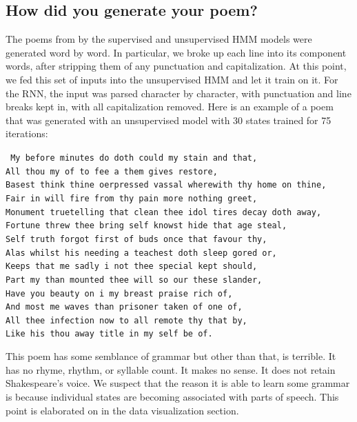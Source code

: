 \subsection{How did you generate your poem?}
The poems from by the supervised and unsupervised HMM models were generated word by word. In particular, we broke up each line into its component words, after stripping them of any punctuation and capitalization. At this point, we fed this set of inputs into the unsupervised HMM and let it train on it. For the RNN, the input was parsed character by character, with punctuation and line breaks kept in, with all capitalization removed. Here is an example of a poem that was generated with an unsupervised model with 30 states trained for 75 iterations: \\
\begin{small}
\texttt{
My before minutes do doth could my stain and that, \\
All thou my of to fee a them gives restore, \\
Basest think thine oerpressed vassal wherewith thy home on thine, \\
Fair in will fire from thy pain more nothing greet, \\
Monument truetelling that clean thee idol tires decay doth away, \\
Fortune threw thee bring self knowst hide that age steal, \\
Self truth forgot first of buds once that favour thy, \\
Alas whilst his needing a teachest doth sleep gored or, \\
Keeps that me sadly i not thee special kept should, \\
Part my than mounted thee will so our these slander, \\
Have you beauty on i my breast praise rich of, \\
And most me waves than prisoner taken of one of, \\
All thee infection now to all remote thy that by, \\
Like his thou away title in my self be of. \\
}
\end{small}
This poem has some semblance of grammar but other than that, is terrible. It has no rhyme, rhythm, or syllable count. It makes no sense. It does not retain Shakespeare's voice. We suspect that the reason it is able to learn some grammar is because individual states are becoming associated with parts of speech. This point is elaborated on in the data visualization section.


